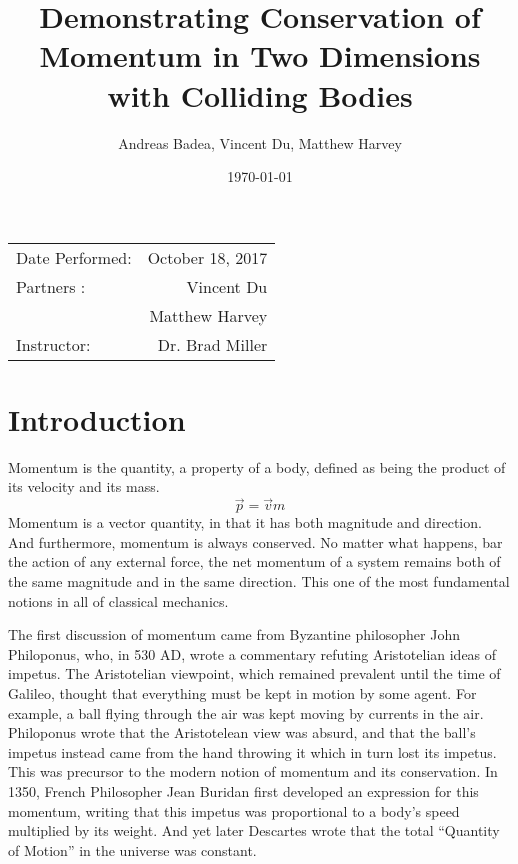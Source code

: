 \documentclass[11pt]{article}
\title{Demonstrating Conservation of Momentum in Two Dimensions with Colliding Bodies}
\author{Andreas Badea, Vincent Du, Matthew Harvey}
\date{\today}
\begin{document}
\maketitle

\begin{center}
	\begin{tabular}{l r}
		Date Performed: & October 18, 2017 \\ %
		Partners : & Vincent Du \\
		& Matthew Harvey \\
		Instructor: & Dr. Brad Miller %
	\end{tabular}
\end{center}
\section{Introduction}
Momentum is the quantity, a property of a body, defined as being the product of its velocity and its mass.
\begin{equation}
\vec{p} = \vec{v} m
\end{equation}
Momentum is a vector quantity, in that it has both magnitude and direction. And furthermore, momentum is always conserved. No matter what happens, bar the action of any external force, the net momentum of a system remains both of the same magnitude and in the same direction. This one of the most fundamental notions in all of classical mechanics. 

The first discussion of momentum came from Byzantine philosopher John Philoponus, who, in 530 AD, wrote a commentary refuting Aristotelian ideas of impetus. The Aristotelian viewpoint, which remained prevalent until the time of Galileo, thought that everything must be kept in motion by some agent. For example, a ball flying through the air was kept moving by currents in the air. Philoponus wrote that the Aristotelean view was absurd, and that the ball's impetus instead came from the hand throwing it which in turn lost its impetus. This was precursor to the modern notion of momentum and its conservation. In 1350, French Philosopher Jean Buridan first developed an expression for this momentum, writing that this impetus was proportional to a body's speed multiplied by its weight. And yet later Descartes wrote that the total ``Quantity of Motion'' in the universe was constant.
\end{document}
